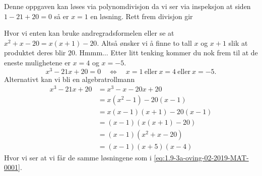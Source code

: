 \documentclass[a4paper,11pt]{article}
\begin{document}
\begin{solution}
   Denne oppgaven kan løses via
  polynomdivisjon da vi ser via inspeksjon at siden $1 - 21 + 20 = 0$ så er $x =
  1$ en løsning. Rett frem divisjon gir
  \begin{center}
  \end{center}
  Hvor vi enten kan bruke andregradsformelen eller se at $x^2 + x - 20 = x(x +
  1) - 20$.  Altså ønsker vi å finne to tall $x$ og $x+1$ slik at produktet
  deres blir $20$. Hmmm$\ldots$ Etter litt tenking kommer du nok frem til at de
  eneste mulighetene er $x=4$ og $x=-5$. 
  \begin{equation}
    \label{eq:1.9-3a-oving-02-2019-MAT-0001}
    x^3 - 21x + 20 = 0 \quad 
    \Leftrightarrow 
    \quad x = 1 \ \text{eller} \ x = 4 \ \text{eller} \ x = -5.
  \end{equation}
  Alternativt kan vi bli en algebratrollmann
  \begin{align*}
    x^3 - 21x + 20 
        & = x^3 - x - 20x + 20 \\
        & = x(x^2 - 1) - 20(x - 1) \\
        & = x(x - 1)(x + 1) - 20(x - 1) \\
        & = (x-1)(x(x+1) - 20) \\
        & = (x-1)(x^2 + x - 20) \\
        & = (x-1)(x + 5)(x - 4)
  \end{align*}
  Hvor vi ser at vi får de samme løsningene som i
  \cref{eq:1.9-3a-oving-02-2019-MAT-0001}.
\end{solution}

\medskip
\end{document}
